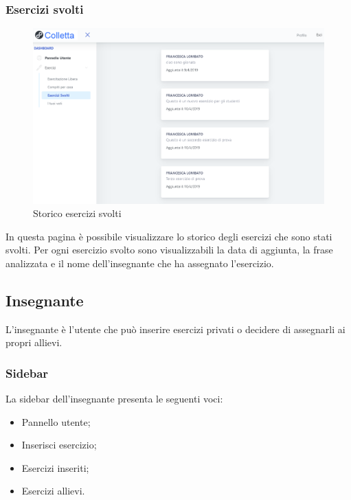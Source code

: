         
        
        \subsubsection{Esercizi svolti}
        	\begin{figure}[H]
            	\centering
            	\includegraphics[width=17cm]{sez/img/studente/esercizisvolti.PNG} 
            	\caption{Storico esercizi svolti}\label{fig:1}
        	\end{figure}
          In questa pagina è possibile visualizzare lo storico degli esercizi che sono stati svolti. Per ogni esercizio svolto sono visualizzabili la data di aggiunta, la frase analizzata e il nome dell'insegnante che ha assegnato l'esercizio.
        
\newpage
    \subsection{Insegnante}
      L'insegnante è l'utente che può inserire esercizi privati o decidere di assegnarli ai propri allievi. 
        \subsubsection{Sidebar}
          La sidebar dell'insegnante presenta le seguenti voci:
        	\begin{itemize}
            	\item Pannello utente;
            	\item Inserisci esercizio;
            	\item Esercizi inseriti;
            	\item Esercizi allievi.
        	\end{itemize}
        
